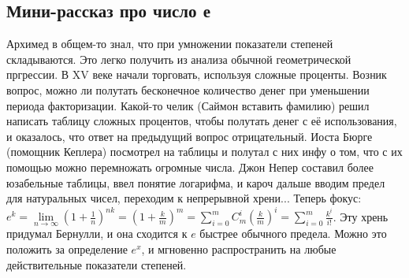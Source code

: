 \subsection{Мини-рассказ про число е}
Архимед в общем-то знал, что при умножении показатели степеней складываются. 
Это легко получить из анализа обычной геометрической пргрессии. В XV веке
начали торговать, используя сложные проценты. Возник вопрос, можно ли 
полутать бесконечное количество денег при уменьшении периода факторизации. 
Какой-то челик (Саймон вставить фамилию) решил написать таблицу сложных 
процентов, чтобы полутать денег с её использования, и оказалось, что ответ на
предыдущий вопрос отрицательный. Иоста Бюрге (помощник Кеплера) посмотрел
на таблицы и полутал с них инфу о том, что с их помощью можно перемножать 
огромные числа. Джон Непер составил более юзабельные таблицы, ввел понятие
логарифма, и кароч дальше вводим предел для натуральных чисел, переходим к 
непрерывной хрени... Теперь фокус: $e^k=\lim\limits_{n \to \infty}(1+
\frac{1}{n})^{nk}=(1+\frac{k}{m})^m=\sum\limits_{i=0}^{m}C^i_m (\frac{k}{m})
^i=\sum\limits_{i=0}^{m} \frac{k^i}{i!}$. Эту хрень придумал Бернулли, 
и она сходится к $e$ быстрее обычного предела. Можно это положить за 
определение $e^x$, и мгновенно распространить на любые действительные 
показатели степеней.


